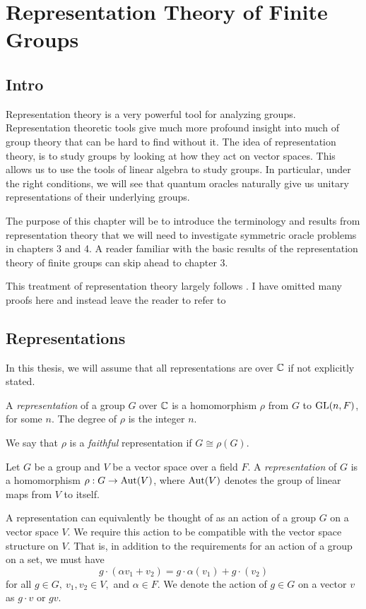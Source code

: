 
\chapter{Representation Theory of Finite Groups}

\section{Intro}


Representation theory is a very powerful tool for analyzing groups. Representation theoretic tools give much more 
profound insight into much of group theory that can be hard to find without it. The idea of representation theory, 
is to study groups by looking at how they act on vector spaces. This allows us to use the tools of linear algebra 
to study groups. In particular, under the right conditions, we will see that quantum oracles naturally give us 
unitary representations of their underlying groups.

The purpose of this chapter will be to introduce the terminology and results from representation theory that we 
will need to investigate symmetric oracle problems in chapters 3 and 4. A reader familiar with the basic results of 
the representation theory of finite groups can skip ahead to chapter 3. 

This treatment of representation theory largely follows \cite{James&Liebeck}. I have omitted many proofs here and 
instead leave the reader to refer to \cite{James&Liebeck}

\section{Representations}





In this thesis, we will assume that all representations are over $\mathbb{C} $ if not explicitly stated.

\begin{definition}
    A \emph{representation} of a group $G$ over $\mathbb{C}$ is a homomorphism $\rho$ from $G$ to $\operatorname{GL}(n,F)$, for some $n$. 
    The degree of $\rho$ is the integer $n$.

    We say that $\rho$ is a \emph{faithful} representation if $G \cong \rho(G)$.
\end{definition}

\begin{definition}
    Let $G$ be a group and $V$ be a vector space over a field $F$. A \emph{representation} of $G$ is a homomorphism 
    $\rho : G \rightarrow \operatorname{Aut}(V)$, where $\operatorname{Aut}(V)$ denotes the group of linear maps from $V$ to itself.

    A representation can equivalently be thought of as an action of a group $G$ on a vector space $V$.  We require 
    this action to be compatible with the vector space structure on $V$. That is, in addition to the requirements 
    for an action of a group on a set, we must have
\[g \cdot (\alpha v_1 + v_2) = g\cdot \alpha(v_1) + g\cdot(v_2)\]
    for all $g \in G,\ v_1, v_2 \in V,$ and $\alpha \in F$.
    We denote the action of $g \in G$ on a vector $v$ as $g \cdot v$ or $gv$.
\end{definition}

